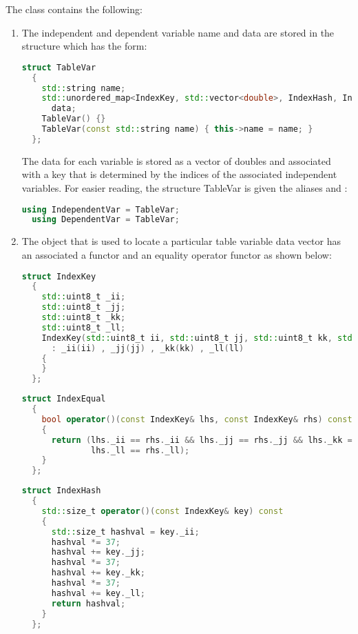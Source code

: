 The  class contains the following:
\begin{enumerate}
  \item The independent and dependent variable name and data are stored in the 
        structure which has the form:
\begin{lstlisting}[language=Cpp]
  struct TableVar
  {
    std::string name;
    std::unordered_map<IndexKey, std::vector<double>, IndexHash, IndexEqual>
      data;
    TableVar() {}
    TableVar(const std::string name) { this->name = name; }
  };
\end{lstlisting}
        The data for each variable is stored as a vector of doubles and associated with a 
        key that is determined by the indices of the associated independent variables.
        For easier reading, the structure TableVar is given the aliases
         and :
\begin{lstlisting}[language=Cpp]
  using IndependentVar = TableVar;
  using DependentVar = TableVar;
\end{lstlisting}

  \item The  object that is used to locate a particular table variable data vector
        has an associated a  functor and an  equality 
        operator functor as shown below:
\begin{lstlisting}[language=Cpp]
  struct IndexKey
  {
    std::uint8_t _ii;
    std::uint8_t _jj;
    std::uint8_t _kk;
    std::uint8_t _ll;
    IndexKey(std::uint8_t ii, std::uint8_t jj, std::uint8_t kk, std::uint8_t ll)
      : _ii(ii) , _jj(jj) , _kk(kk) , _ll(ll)
    {
    }
  };
\end{lstlisting}
\begin{lstlisting}[language=Cpp]
  struct IndexEqual
  {
    bool operator()(const IndexKey& lhs, const IndexKey& rhs) const
    {
      return (lhs._ii == rhs._ii && lhs._jj == rhs._jj && lhs._kk == rhs._kk &&
              lhs._ll == rhs._ll);
    }
  };
\end{lstlisting}
\begin{lstlisting}[language=Cpp]
  struct IndexHash
  {
    std::size_t operator()(const IndexKey& key) const
    {
      std::size_t hashval = key._ii;
      hashval *= 37;
      hashval += key._jj;
      hashval *= 37;
      hashval += key._kk;
      hashval *= 37;
      hashval += key._ll;
      return hashval;
    }
  };
\end{lstlisting}

\end{enumerate}

